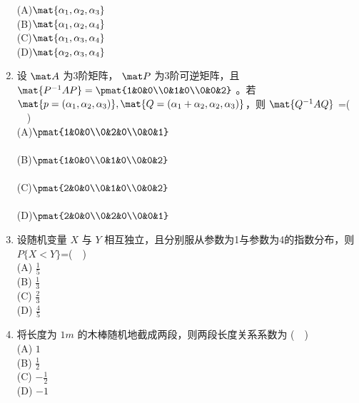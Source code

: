 \begin{enumerate}
(A)$\mat{ \alpha_1,\alpha_2,\alpha_3}$\\
(B)$\mat{ \alpha_1,\alpha_2,\alpha_4}$\\
(C)$\mat{ \alpha_1,\alpha_3,\alpha_4}$\\
(D)$\mat{ \alpha_2,\alpha_3,\alpha_4}$
\item 设 $\mat A$  为3阶矩阵， $\mat P$ 为3阶可逆矩阵，且 $\mat{P^{-1}AP}=\pmat{1&0&0\\0&1&0\\0&0&2}$  。若 $\mat{p=(\alpha_1,\alpha_2,\alpha_3)},\mat{Q=(\alpha_1+\alpha_2,\alpha_2,\alpha_3)}$，则 $\mat {Q^{-1}AQ}$ =($\quad$)\\
(A)$\pmat{1&0&0\\0&2&0\\0&0&1}$\\ \\
(B)$\pmat{1&0&0\\0&1&0\\0&0&2}$\\ \\
(C)$\pmat{2&0&0\\0&1&0\\0&0&2}$\\ \\
(D)$\pmat{2&0&0\\0&2&0\\0&0&1}$\\
\item 设随机变量 $X$ 与 $Y$ 相互独立，且分别服从参数为1与参数为4的指数分布，则  $P\{X<Y\}$=($\quad$)\\
(A) $\displaystyle \frac{1}{5}$\\
(B) $ \displaystyle \frac{1}{3}$\\
(C) $\displaystyle  \frac{2}{3}$\\
(D) $\displaystyle \frac{4}{5}$
\item  将长度为 $1m$ 的木棒随机地截成两段，则两段长度关系系数为 ($\quad$)\\
(A) $1$\\
(B) $\displaystyle \frac{1}{2}$\\
(C) $\displaystyle -\frac{1}{2}$\\
(D) $-1$
\end{enumerate}
